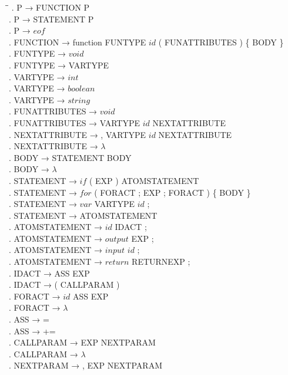 \begin{tabbing}
    \hspace{1cm}\=\hspace{10cm}\=\kill
    . P → FUNCTION P\\
    . P → STATEMENT P\\
    . P → $eof$\\
    . FUNCTION → function FUNTYPE $id$ ( FUNATTRIBUTES ) \{ BODY \}\\
    . FUNTYPE → $void$\\
    . FUNTYPE → VARTYPE\\
    . VARTYPE → $int$\\
    . VARTYPE → $boolean$\\
    . VARTYPE → $string$\\
    . FUNATTRIBUTES → $void$\\
    . FUNATTRIBUTES → VARTYPE $id$ NEXTATTRIBUTE\\
    . NEXTATTRIBUTE → , VARTYPE $id$ NEXTATTRIBUTE\\
    . NEXTATTRIBUTE → $\lambda$\\
    . BODY → STATEMENT BODY\\
    . BODY → $\lambda$\\
    . STATEMENT → $if$ ( EXP ) ATOMSTATEMENT\\
    . STATEMENT → $for$ ( FORACT ; EXP ; FORACT ) \{ BODY \}\\
    . STATEMENT → $var$ VARTYPE $id$ ;\\
    . STATEMENT → ATOMSTATEMENT\\
    . ATOMSTATEMENT → $id$ IDACT ;\\
    . ATOMSTATEMENT → $output$ EXP ;\\
    . ATOMSTATEMENT → $input$ $id$ ;\\
    . ATOMSTATEMENT → $return$ RETURNEXP ;\\
    . IDACT → ASS EXP\\
    . IDACT → ( CALLPARAM )\\
    . FORACT → $id$ ASS EXP\\
    . FORACT → $\lambda$\\
    . ASS → =\\
    . ASS → +=\\
    . CALLPARAM → EXP NEXTPARAM\\
    . CALLPARAM → $\lambda$\\
    . NEXTPARAM → , EXP NEXTPARAM\\

\end{tabbing}
